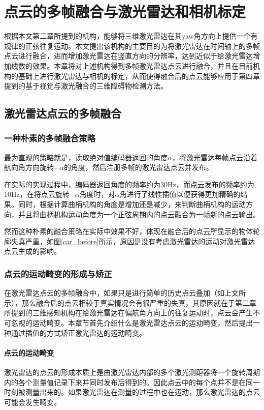 

\chapter{点云的多帧融合与激光雷达和相机标定}
根据本文第二章所提到的机构，能够将三维激光雷达在其yaw角方向上提供一个有规律的正弦往复运动。本文提出该机构的主要目的为将激光雷达在时间轴上的多帧点云进行融合，进而增加激光雷达在竖直方向的分辨率，达到近似于给激光雷达增加线数的效果。本章将对上述机构得到多帧激光雷达点云进行融合，并且在目前机构的基础上进行激光雷达与相机的标定，从而使得融合后的点云能够应用于第四章提到的基于视觉与激光融合的三维障碍物检测方法。

\section{激光雷达点云的多帧融合}

\subsection{一种朴素的多帧融合策略}

最为直观的策略就是，读取绝对值编码器返回的角度$\alpha$，将激光雷达每帧点云沿着航向角方向旋转$-\alpha$的角度，然后注册多帧的激光雷达点云并发布。

在实际的实现过程中，编码器返回角度的频率约为30Hz，而点云发布的频率约为10Hz，在将点云旋转$-\alpha$角度时，对$\alpha$角进行了线性插值以便获得更加精确的结果。同时，根据计算曲柄机构的角度是增加还是减少，来判断曲柄机构的运动方向，并且将曲柄机构运动角度为一个正弦周期内的点云融合为一帧新的点云输出。

然而这种朴素的融合策略在实际中效果不好，体现在融合后的点云所显示的物体轮廓失真严重，如图\ref{car_before}所示，原因是没有考虑激光雷达的运动对激光雷达点云生成的影响。

\subsection{点云的运动畸变的形成与矫正}
在激光雷达点云的多帧融合中，如果只是进行简单的历史点云叠加（如上文所示），那么融合后的点云相较于真实情况会有很严重的失真，其原因就在于第二章所提到的三维感知机构在给激光雷达在偏航角方向上的往复运动时，点云会产生不可忽视的运动畸变。本章节首先介绍什么是激光雷达点云的运动畸变，然后提出一种通过插值的方式矫正激光雷达的运动畸变。

\subsubsection{点云的运动畸变}
激光雷达的点云的形成本质上是由激光雷达内部的多个激光测距器将一个旋转周期内的各个测量值记录下来并同时发布后得到的。因此点云中的每个点并不是在同一时刻被测量出来的。如果激光雷达在测量的过程中也在运动，那么激光雷达的点云可能会发生畸变。

